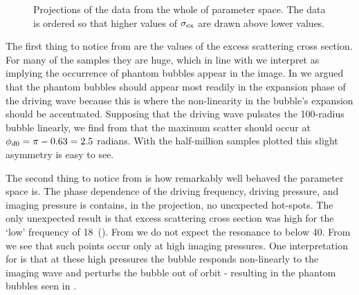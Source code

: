  \begin{figure}
  \begin{minipage}{\textwidth}
   \begin{center}
      \begin{narrow}{0cm}{-1cm}
        \subfloat[]{
     \label{fig:projection:dr_fr}
     } 
  \subfloat[]{
    \label{fig:projection:im_fr}
    }
  \end{narrow}
  \begin{narrow}{-1cm}{-1cm}
\subfloat[]{
     \label{fig:projection:dr_amp}
     }
\subfloat[]{
     \label{fig:projection:im_amp}
     }
 \end{narrow}
 \caption{Projections of the data from the whole of parameter space.
      The data is ordered so that higher values of $\sigma_\textrm{ex}$ are drawn above lower values.
   }
     \label{fig:projections}
 \end{center}
  \end{minipage}
 \end{figure}

The first thing to notice from   are the values of the excess scattering cross section.
For many of the samples they are huge,
which in line with  we interpret as implying the occurrence of phantom bubbles appear in the image.
In  we argued that the phantom bubbles should appear most readily 
in the expansion phase of the driving wave because this is where the non-linearity in the bubble's expansion should be accentuated.
Supposing that the driving wave pulsates the \unit{100}\nano\metre-radius bubble linearly,
we find from  that the maximum scatter should occur at ${\phi_{d0}} = \pi - 0.63 = 2.5$ radians.
With the half-million samples plotted this slight  asymmetry is easy to see.



The second thing to notice from   is  how remarkably well behaved the parameter space is.
The phase dependence of the driving frequency, driving pressure, and imaging pressure is contains, in the projection, 
no unexpected hot-spots.
The only unexpected result is that excess scattering cross section was high for the `low' frequency of \unit{18}\mega\hertz\ ().
From  we do not expect the resonance to below \unit{40}\mega\hertz.
From  we see that such points occur only at high imaging pressures.
One interpretation for  is that at these high pressures the bubble responds non-linearly to the imaging wave
and perturbs the bubble out of orbit - resulting in the phantom bubbles seen in .



